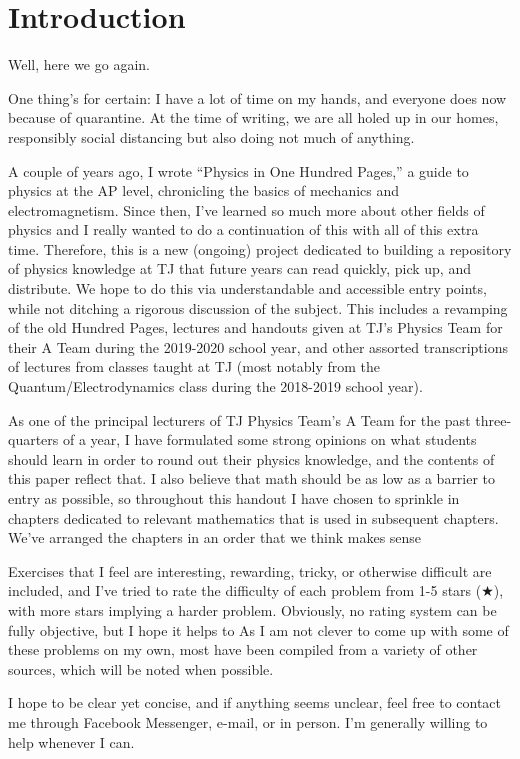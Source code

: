 \setcounter{section}{-1}
\section{Introduction}
Well, here we go again. 

One thing's for certain: I have a lot of time on my hands, and everyone does now because of quarantine. At the time of writing, we are all holed up in our homes, responsibly social distancing but also doing not much of anything. 

A couple of years ago, I wrote ``Physics in One Hundred Pages,'' a guide to physics at the AP level, chronicling the basics of mechanics and electromagnetism. Since then, I've learned so much more about other fields of physics and I really wanted to do a continuation of this with all of this extra time. Therefore, this is a new (ongoing) project dedicated to building a repository of physics knowledge at TJ that future years can read quickly, pick up, and distribute. We hope to do this via understandable and accessible entry points, while not ditching a rigorous discussion of the subject. This includes a revamping of the old Hundred Pages, lectures and handouts given at TJ's Physics Team for their A Team during the 2019-2020 school year, and other assorted transcriptions of lectures from classes taught at TJ (most notably from the Quantum/Electrodynamics class during the 2018-2019 school year). 

As one of the principal lecturers of TJ Physics Team's A Team for the past three-quarters of a year, I have formulated some strong opinions on what students should learn in order to round out their physics knowledge, and the contents of this paper reflect that. I also believe that math should be as low as a barrier to entry as possible, so throughout this handout I have chosen to sprinkle in chapters dedicated to relevant mathematics that is used in subsequent chapters. We've arranged the chapters in an order that we think makes sense 

Exercises that I feel are interesting, rewarding, tricky, or otherwise difficult are included, and I've tried to rate the difficulty of each problem from 1-5 stars ($\bigstar$), with more stars implying a harder problem. Obviously, no rating system can be fully objective, but I hope it helps to 
As I am not clever to come up with some of these problems on my own, most have been compiled from a variety of other sources, which will be noted when possible. 

I hope to be clear yet concise, and if anything seems unclear, feel free to contact me through Facebook Messenger, e-mail, or in person. I'm generally willing to help whenever I can.


